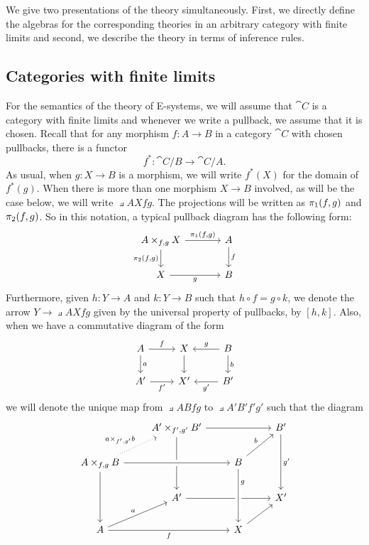 \documentclass{article}
\begin{document}
We give two presentations of the theory simultaneously. First, we directly
define the algebras for the corresponding theories in an arbitrary category
with finite limits and second, we describe the theory in terms of inference
rules.

\subsection{Categories with finite limits}
For the semantics of the theory of E-systems, we will assume that $\cat{C}$ is a 
category with finite limits and
whenever we write a pullback, we assume that it is chosen. Recall that for
any morphism $f:A\to B$ in a category $\cat{C}$ with chosen pullbacks, there
is a functor
\begin{equation*}
f^\ast : \cat{C}/B\to\cat{C}/A.
\end{equation*}
As usual, when $g:X\to B$ is a morphism, we will write $f^\ast(X)$ for the
domain of $f^\ast(g)$. When there is more than one morphism $X\to B$ involved,
as will be the case below, we will write $\pullback{A}{X}{f}{g}$. The projections
will be written as $\pi_{1}(f,g)$ and $\pi_{2}(f,g)$. So in this notation, a
typical pullback diagram has the following form:
\begin{equation*}
\begin{tikzcd}[column sep=large]
\pullback{A}{X}{f}{g}
  \ar{r}{\pullbackpr{1}{f}{g}}
  \ar{d}[swap]{\pullbackpr{2}{f}{g}}
  &
A \ar{d}{f}
  \\
X \ar{r}[swap]{g}
  &
B
\end{tikzcd}
\end{equation*}
Furthermore, given $h:Y\to A$ and $k:Y\to B$ such that $h\circ f=g\circ k$, we
denote the arrow $Y\to\pullback{A}{X}{f}{g}$ given by the universal property of
pullbacks, by $[h,k]$. Also, when we have a commutative diagram of the form
\begin{equation*}
\begin{tikzcd}
A \ar{r}{f}
  \ar{d}{a}
  &
X \ar{d}
  & 
B \ar{l}[swap]{g}
  \ar{d}{b}
  \\
A'
  \ar{r}[swap]{f'}
  &
X'
  &
B'
  \ar{l}{g'}
\end{tikzcd}
\end{equation*}
we will denote the unique map from $\pullback{A}{B}{f}{g}$ to $\pullback{A'}{B'}{f'}{g'}$
such that the diagram
\begin{equation*}
\begin{tikzcd}
  {}
  & 
\pullback{A'}{B'}{f'}{g'}
  \ar{dd}
  \ar{rr}
  &
  &
B'
  \ar{dd}{g'}
  \\
\pullback{A}{B}{f}{g}
  \ar{dd}
  \ar[crossing over]{rr}
  \ar[dotted]{ur}{\pullback{a}{b}{f'}{g'}}
  &
  &
B \ar{ur}{b}
  \\
  {}
  &
A'
  \ar{rr}
  &
  &
X'
  \\
A \ar{rr}[swap]{f}
  \ar{ur}{a}
  &
  &
X \ar[crossing over,leftarrow]{uu}[near end,swap]{g}
  \ar{ur}
\end{tikzcd}
\end{equation*}
\end{document}
